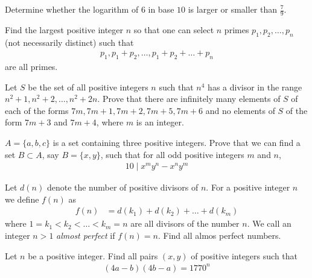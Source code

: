 \documentclass[problems.tex]{subfile}
\begin{document}
	\begin{problem}
		Determine whether the logarithm of $6$ in base $10$ is larger or smaller than $\displaystyle\frac{7}{9}$.
	\end{problem}

	\begin{problem}
		Find the largest positive integer $n$ so that one can select $n$ primes $p_1, p_2, \dots, p_n$ (not necessarily distinct) such that
		\begin{align*}
			p_1, p_1+p_2, \dots, p_1+p_2+\dots+p_n
		\end{align*}
		are all primes.
	\end{problem}

	\begin{problem}
		Let $S$ be the set of all positive integers $n$ such that $n^4$ has a divisor in the range $n^2 +1, n^2 + 2,\dots,n^2 + 2n$. Prove that there are infinitely many elements of $S$ of each of the forms $7m, 7m+1, 7m+2, 7m+5, 7m+6$ and no elements of $S$ of the form $7m+3$ and $7m+4$, where $m$ is an integer. %
	\end{problem}

	\begin{problem}
		$A=\{a,b,c\}$ is a set containing three positive integers. Prove that we can find a set $B \subset A$, say $B=\{x,y\}$, such that for all odd positive integers $m$ and $n$,
		\begin{align*}
			10 \mid x^m y^n - x^n y^m
		\end{align*}
	\end{problem}

	\begin{problem}
		Let $d(n)$ denote the number of positive divisors of $n$. For a positive integer $n$ we define $f(n)$ as
		\begin{align*}
			f(n) & = d(k_1) + d(k_2) + \ldots + d(k_m)
		\end{align*}
		where $ 1=k_1 < k_2 < \ldots < k_m=n$ are all divisors of the number $n$. We call an integer $n>1$ \textit{almost perfect} if $f(n)=n$. Find all almos perfect numbers.
	\end{problem}

	\begin{problem}
		Let $n$ be a positive integer. Find all pairs $(x,y)$ of positive integers such that
		\begin{align*}
			(4a-b)(4b-a)=1770^n
		\end{align*}
	\end{problem}
\end{document}
